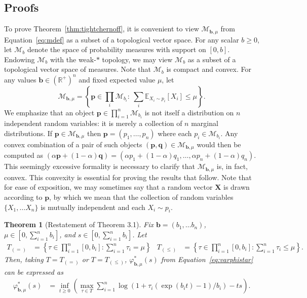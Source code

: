 \documentclass[12pt]{article}
\theoremstyle{plain}
\newtheorem*{theorem*}{Theorem}
\begin{document}
\begin{appendix}
\section*{Proofs}\label{appn}

To prove Theorem~\ref{thm:tightchernoff}, it is convenient to view $\mathcal{M}_{\boldsymbol{b},\mu}$ from Equation~\ref{eq:mdef} as a subset of a topological vector space.  For any scalar $b\geq 0$, let $\mathcal{M}_b$ denote the space of probability measures with support on $[0,b]$.  Endowing $\mathcal{M}_b$ with the weak-$*$ topology, we may view $\mathcal{M}_b$ as a subset of a topological vector space of measures.  Note that $\mathcal{M}_b$ is compact and convex.  For any values $\boldsymbol{b}\in ({\mathbb{R}^+})^n$ and fixed expected value $\mu$, let
\[
\mathcal{M}_{\boldsymbol{b},\mu} = \left\{\boldsymbol{p} \in \prod_i \mathcal{M}_{b_i}:\ \sum_i\mathbb{E}_{X_i \sim p_i}[X_i] \leq \mu\right\}.
\]
We emphasize that an object
$\boldsymbol{p} \in \prod_{i=1}^n \mathcal{M}_{b_i}$
is not itself a distribution on $n$ independent random variables: it is merely a collection of $n$ marginal distributions.  If $\boldsymbol{p} \in \mathcal{M}_{\boldsymbol{b},\mu}$ then $\boldsymbol{p}=(p_1,\ldots, p_n)$ where each $p_i \in \mathcal{M}_{b_i}$.  Any convex combination of a pair of such objects $(\boldsymbol{p},\boldsymbol{q}) \in \mathcal{M}_{\boldsymbol{b},\mu}$ would then be computed as $(\alpha \boldsymbol{p}+(1-\alpha)\boldsymbol{q})=(\alpha p_1+(1-\alpha) q_1,\ldots, \alpha p_n+(1-\alpha) q_n)$.  This seemingly excessive formality is necessary to clarify that $\mathcal{M}_{\boldsymbol{b},\mu}$ is, in fact, convex.  This convexity is essential for proving the results that follow.  Note that for ease of exposition, we may sometimes say that a random vector $\boldsymbol{X}$ is drawn according to $\boldsymbol{p}$, by which we mean that the collection of random variables $\{X_1,\ldots X_n\}$ is mutually independent and each $X_i \sim p_i$.

\begin{theorem*}[Restatement of Theorem 3.1]  Fix $\boldsymbol{b}=(b_1,\ldots b_n)$, $\mu \in [0,\sum_{i=1}^n b_i]$, and $s \in [0,\sum_{i=1}^n b_i]$.  Let
\begin{align*}
T_{(=)}& =\left\{\tau\in \prod_{i=1}^n [0,b_i] : \sum_{i=1}^n \tau_i = \mu\right\} &
T_{(\leq)}& =\left\{\tau\in \prod_{i=1}^n [0,b_i] : \sum_{i=1}^n \tau_i \leq \mu\right\}.
\end{align*}
Then, taking $T=T_{(=)}$ or $T=T_{(\leq)}$, $\varphi^*_{\boldsymbol{b},\mu}(s)$ from Equation~\ref{eq:varphistar} can be expressed as
\begin{align*}
\varphi^*_{\boldsymbol{b},\mu}(s)
&= \inf_{t\geq 0} \left(\max_{\tau \in T} \sum_{i=1}^n \log\left(1+\tau_i (\exp(b_i t)-1)/b_i \right) - ts\right).
\end{align*}
\end{theorem*}


\end{appendix}
\end{document}
